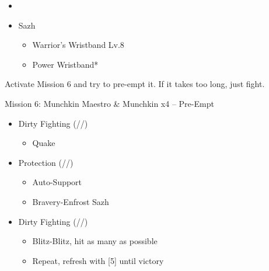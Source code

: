\begin{menu}
	\begin{itemize}
		\paradigm
		\begin{itemize}
			\item {}%
				  {\paradigmline{\syn}{\med}{\com}}%
			      {\paradigmline{\rav}{(\sab)}{\rav}}%
			      {\paradigmline{(\syn)}{\med}{(\sen)}}%
			      {\paradigmline{(\syn)}{\sab}{\rav}}%
			      {\paradigmline{\com}{(\sab)}{\com}}%
			      {\paradigmline[4]{(\com)}{(\sab)}{\sen}}
		\end{itemize}
		\equip
		\begin{itemize}
			\item Sazh
				\begin{itemize}
					\item Warrior's Wristband Lv.8
					\item Power Wristband*
				\end{itemize}
		\end{itemize}
	\end{itemize}
\end{menu}

\renewcommand{\second}{[2] Smart Bomb (\rav/\sab/\rav)}
\renewcommand{\third}{[3] Protection (\syn/\med/\sen)}
\renewcommand{\fourth}{[4] Guerilla (\syn/\sab/\rav)}
\renewcommand{\fifth}{[5] Devastation (\com/\sab/\com)}
\renewcommand{\sixth}{[6] Dirty Fighting (\com/\sab/\sen)}

Activate Mission 6 and try to pre-empt it. If it takes too long, just fight.

\begin{battle}{Mission 6: Munchkin Maestro \& Munchkin x4 -- Pre-Empt}
	\begin{itemize}
		\item \sixth
			\begin{itemize}
				\item Quake
			\end{itemize}
		\item \third
			\begin{itemize}
				\item Auto-Support
				\item Bravery-Enfrost Sazh
			\end{itemize}
		\item \sixth
			\begin{itemize}
				\item Blitz-Blitz, hit as many as possible
				\item Repeat, refresh with [5] until victory
			\end{itemize}
	\end{itemize}
\end{battle}

